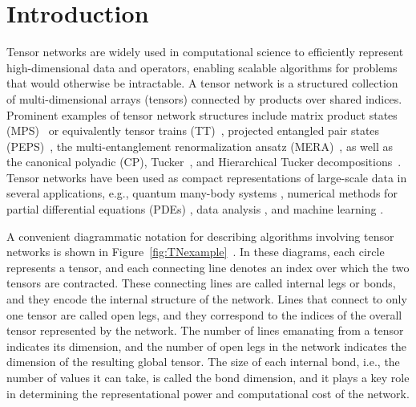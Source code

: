 \documentclass[pdflatex,sn-mathphys-num]{sn-jnl}
\newcounter{thm}[section]
\begin{document}

\maketitle

\section{Introduction}
\label{sec:intro}
Tensor networks are widely used in computational science to efficiently represent high-dimensional data and operators, enabling scalable algorithms for problems that would otherwise be intractable. A tensor network is a structured collection of multi-dimensional arrays (tensors) connected by products over shared indices. Prominent examples of tensor network structures include matrix product states (MPS)~\cite{Perez2006} or equivalently tensor trains (TT)~\cite{Oseledets2011}, projected entangled pair states (PEPS)~\cite{Orus2014, Cirac2021}, the multi-entanglement renormalization ansatz (MERA)~\cite{vidalClassQuantumManyBody2008, Evenbly2015}, as well as the canonical polyadic (CP), Tucker~\cite{kolda2009tensor}, and Hierarchical Tucker decompositions~\cite{Uschmajew2013}. Tensor networks have been used as compact representations of large-scale data in several applications, e.g., quantum many-body systems \cite{Orus2019}, numerical methods for partial differential equations (PDEs) \cite{Bachmayr2016, Dektor2021}, data analysis \cite{cichocki2014}, and machine learning \cite{Stoudenmire2018, Zangrando2024}. 
%

A convenient diagrammatic notation for describing algorithms involving tensor networks is shown in Figure~\ref{fig:TNexample}~\cite{SCHOLLWOCK201196,ciracMatrixProductStates2021}. In these diagrams, each circle represents a tensor, and each connecting line denotes an index over which the two tensors are contracted. These connecting lines are called internal legs or bonds, and they encode the internal structure of the network. Lines that connect to only one tensor are called open legs, and they correspond to the indices of the overall tensor represented by the network. The number of lines emanating from a tensor indicates its dimension, and the number of open legs in the network indicates the dimension of the resulting global tensor. The size of each internal bond, i.e., the number of values it can take, is called the bond dimension, and it plays a key role in determining the representational power and computational cost of the network. 
\end{document}
